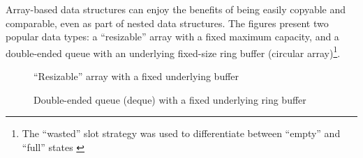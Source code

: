 Array-based data structures can enjoy the benefits of being easily copyable and
comparable, even as part of nested data structures. The figures present two
popular data types: a ``resizable'' array with a fixed maximum capacity, and a
double-ended queue with an underlying fixed-size ring buffer (circular
array)\footnote{The ``wasted'' slot strategy was used to differentiate between
	``empty'' and ``full'' states \autocite{ringBuffer}}.

\begin{figure}
	\caption{``Resizable'' array with a fixed underlying buffer}
\end{figure}

\begin{figure}
	\caption{Double-ended queue (deque) with a fixed underlying ring buffer}
\end{figure}
